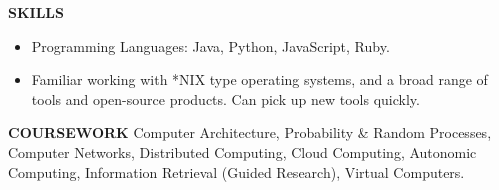 \documentclass[10pt, letterpaper]{article}
\begin{document}

\textbf{SKILLS}
\smallskip 
\begin{itemize}
    \item Programming Languages: Java, Python, JavaScript, Ruby.
    \item Familiar working with *NIX type operating systems, and a broad range of tools and open-source products. Can pick up new tools quickly.
\end{itemize} 

\textbf{COURSEWORK}
\smallskip 
\newline
Computer Architecture, Probability \& Random Processes, Computer Networks, 
Distributed Computing, Cloud Computing, Autonomic Computing, Information Retrieval (Guided Research), Virtual Computers.
\end{document}
